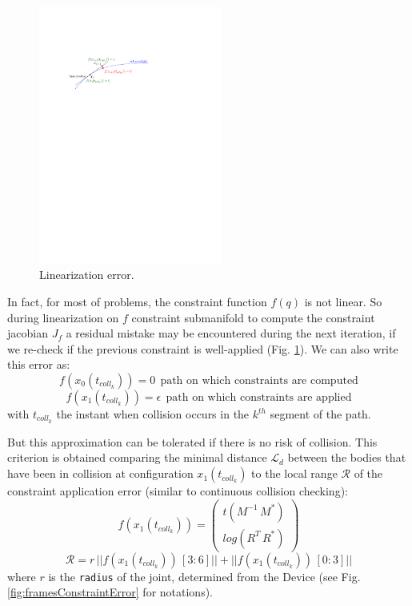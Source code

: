 \documentclass {article}
\newcommand\tcollk{t_{coll_k}}
\begin{document}
\begin{figure}
	\includegraphics[width=6cm]{linearError.pdf}
	\caption{Linearization error.}
	\label{fig:linearError}
\end{figure}

In fact, for most of problems, the constraint function $f(q)$ is not linear. So during linearization on  $f$ constraint submanifold to compute the constraint jacobian $J_f$ a residual mistake may be encountered during the next iteration, if we re-check if the previous constraint is well-applied (Fig. \ref{fig:linearError}). We can also write this error as:
$$
f(x_0(\tcollk)) = 0 \ \ \text{path on which constraints are computed}
$$
$$
f(x_1(\tcollk)) = \epsilon \ \ \text{path on which constraints are applied}
$$
with $\tcollk$ the instant when collision occurs in the $k^{th}$ segment of the path.

\vspace{0.2cm}

But this approximation can be tolerated if there is no risk of collision. This criterion is 
obtained comparing the minimal distance $\mathscr{L}_d$ between the bodies that have been in collision at configuration $x_1(\tcollk)$ 
to the local range $\mathscr{R}$ of the constraint application error (similar to continuous collision checking):
$$
f(x_1(\tcollk)) = 
\begin{pmatrix}
t(M^{-1}\, M^*) \\
log(R^T\,R^*)
\end{pmatrix}
$$
$$
\mathscr{R} = r \, ||f(x_1(\tcollk))\,[3:6]|| + ||f(x_1(\tcollk))\,[0:3]||
$$
where $r$ is the \texttt{radius} of the joint, determined from the Device (see Fig. \ref{fig:framesConstraintError} for notations).
\end{document}
